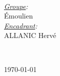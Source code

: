 \begin{titlepage}
\begin{minipage}{0.4\textwidth}
\begin{flushleft}
\end{flushleft}
\end{minipage}
~
\begin{minipage}{0.4\textwidth}
\begin{flushright} \large
\emph{\underline{Groupe}:} \\
Émoulien \\[1.2em] %

\emph{\underline{Encadrant}:} \\
ALLANIC Hervé%
\end{flushright}
\end{minipage}\\[2cm]
\makeatother



{\large \today}\\[2cm] %

\vfill %

\end{titlepage}